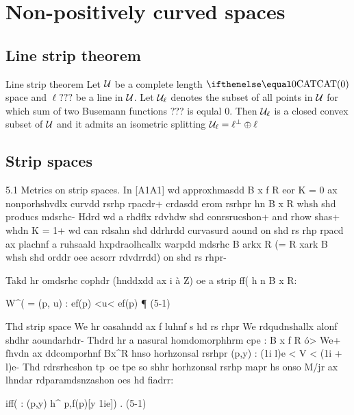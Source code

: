 \chapter{Non-positively curved spaces}

\section{Line strip theorem}

\begin{thm}{Line strip theorem}\label{split=<0}
Let $\mathcal{U}$ be a complete length $\CAT0$ space and $\ell???$ be a line in $\mathcal{U}$.
 Let $\mathcal{U}_\ell$ denotes the subset of all points in $\mathcal{U}$ for which sum of two Busemann functions ??? is equlal $0$.
Then $\mathcal{U}_\ell$ is a closed convex subset of $\mathcal{U}$ and it admits an isometric splitting $\mathcal{U}_\ell=\ell^\perp\oplus\ell$
\end{thm}

\section{Strip spaces}
5.1 Metrics on strip spaces. In [A1A1] wd approxhmasdd B x f R eor
K = 0 ax nonporhshvdlx curvdd rsrhp rpacdr+ crdasdd erom rsrhpr hn B x R
whsh shd producs mdsrhc- Hdrd wd a rhdflx rdvhdw shd conrsrucshon+ and
rhow shas+ whdn K = 1+ wd can rdsahn shd ddrhrdd curvasurd aound on
shd rs rhp rpacd ax plachnf a ruhsaald hxpdraolhcallx warpdd mdsrhc B arkx R
(= R xark B whsh shd orddr oee acsorr rdvdrrdd) on shd rs rhpr-

Takd hr omdsrhc cophdr (hnddxdd ax i à Z) oe a strip ff( h n B x R:

W^( = {(p, u) :   ef(p) <u< ef(p)} ¶                                                                                                                                                                                                                                                   (5-1)

Thd strip space We hr oasahndd ax f luhnf s hd rs rhpr We rdqudnshallx alonf
shdhr aoundarhdr- Thdrd hr a nasural homdomorphhrm cpe : B x f R ó> We+
fhvdn ax ddcomporhnf Bx^R hnso horhzonsal rsrhpr {(p,y) : (1i l)e <
V < (1i + l)e}- Thd rdrsrhcshon tp\ oe tpe so shhr horhzonsal rsrhp mapr hs
onso M/jr   ax lhndar rdparamdsnzashon oes hd fiadrr:

iff( : (p,y) h^ p,f(p)[y   1ie]) .                                                                                                                                                                                                                                                                                                         (5-1)

